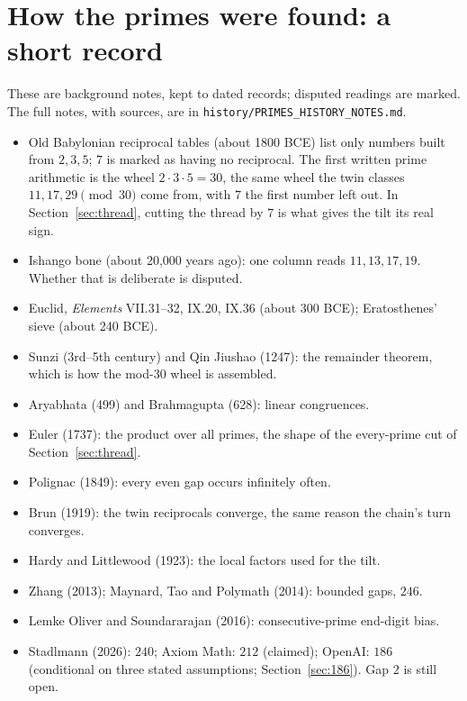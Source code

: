 \documentclass[11pt]{article}
\theoremstyle{definition}
\theoremstyle{remark}
\begin{document}
\section{How the primes were found: a short record}
These are background notes, kept to dated records; disputed readings are marked. The full notes, with sources, are in \texttt{history/PRIMES\_HISTORY\_NOTES.md}.
\begin{itemize}
\item Old Babylonian reciprocal tables (about 1800 BCE) list only numbers built from $2,3,5$; $7$ is marked as having no reciprocal. The first written prime arithmetic is the wheel $2\cdot3\cdot5=30$, the same wheel the twin classes $11,17,29\pmod{30}$ come from, with $7$ the first number left out. In Section~\ref{sec:thread}, cutting the thread by $7$ is what gives the tilt its real sign.
\item Ishango bone (about 20{,}000 years ago): one column reads $11,13,17,19$. Whether that is deliberate is disputed.
\item Euclid, \emph{Elements} VII.31--32, IX.20, IX.36 (about 300 BCE); Eratosthenes' sieve (about 240 BCE).
\item Sunzi (3rd--5th century) and Qin Jiushao (1247): the remainder theorem, which is how the mod-30 wheel is assembled.
\item Aryabhata (499) and Brahmagupta (628): linear congruences.
\item Euler (1737): the product over all primes, the shape of the every-prime cut of Section~\ref{sec:thread}.
\item Polignac (1849): every even gap occurs infinitely often.
\item Brun (1919): the twin reciprocals converge, the same reason the chain's turn converges.
\item Hardy and Littlewood (1923): the local factors used for the tilt.
\item Zhang (2013); Maynard, Tao and Polymath (2014): bounded gaps, $246$.
\item Lemke Oliver and Soundararajan (2016): consecutive-prime end-digit bias.
\item Stadlmann (2026): $240$; Axiom Math: $212$ (claimed); OpenAI: $186$ (conditional on three stated assumptions; Section~\ref{sec:186}). Gap $2$ is still open.
\end{itemize}
\end{document}
